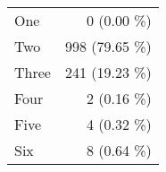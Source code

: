 \begin{tabular}{ l  r }
One & 0 (0.00 \%)\\
Two & 998 (79.65 \%)\\
Three & 241 (19.23 \%)\\
Four & 2 (0.16 \%)\\
Five & 4 (0.32 \%)\\
Six & 8 (0.64 \%)\\
\end{tabular}